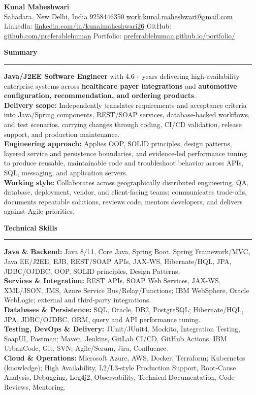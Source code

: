 \documentclass[11pt,letterpaper]{article}
\newcommand{\ressection}[1]{\Needspace{6\baselineskip}\vspace{8pt}\par\textbf{#1}\par\vspace{2pt}\hrule\vspace{5pt}}
\begin{document}
\pagestyle{empty}\raggedright\fontsize{11}{12.5}\selectfont

{\Large \textbf{Kunal Maheshwari}}\\
Sahadara, New Delhi, India \textbar{} 9258446350 \textbar{} \href{mailto:work.kunal.maheshwari@gmail.com}{work.kunal.maheshwari@gmail.com}\\
LinkedIn: \href{https://www.linkedin.com/in/kunalmaheshwari26}{linkedin.com/in/kunalmaheshwari26} \textbar{} GitHub: \href{https://github.com/preferablehuman}{github.com/preferablehuman} \textbar{} Portfolio: \href{https://preferablehuman.github.io/portfolio/}{preferablehuman.github.io/portfolio/}

\ressection{Summary}
\textbf{Java/J2EE Software Engineer} with 4.6+ years delivering high-availability enterprise systems across \textbf{healthcare payer integrations} and \textbf{automotive configuration, recommendation, and ordering products}.\\[2pt]
\textbf{Delivery scope:} Independently translates requirements and acceptance criteria into Java/Spring components, REST/SOAP services, database-backed workflows, and test scenarios, carrying changes through coding, CI/CD validation, release support, and production maintenance.\\[2pt]
\textbf{Engineering approach:} Applies OOP, SOLID principles, design patterns, layered service and persistence boundaries, and evidence-led performance tuning to produce reusable, maintainable code and troubleshoot behavior across APIs, SQL, messaging, and application servers.\\[2pt]
\textbf{Working style:} Collaborates across geographically distributed engineering, QA, database, deployment, vendor, and client-facing teams; communicates trade-offs, documents repeatable solutions, reviews code, mentors developers, and delivers against Agile priorities.

\ressection{Technical Skills}
\textbf{Java \& Backend:} Java 8/11, Core Java, Spring Boot, Spring Framework/MVC, Java EE/J2EE, EJB, REST/SOAP APIs, JAX-WS, Hibernate/HQL, JPA, JDBC/OJDBC, OOP, SOLID principles, Design Patterns.\\
\textbf{Services \& Integration:} REST APIs, SOAP Web Services, JAX-WS, XML/JSON, JMS, Azure Service Bus/Relay/Functions; IBM WebSphere, Oracle WebLogic; external and third-party integrations.\\
\textbf{Databases \& Persistence:} SQL, Oracle, DB2, PostgreSQL; Hibernate/HQL, JPA, JDBC/OJDBC, ORM, query and API performance tuning.\\
\textbf{Testing, DevOps \& Delivery:} JUnit/JUnit4, Mockito, Integration Testing, SoapUI, Postman; Maven, Jenkins, GitLab CI/CD, GitHub Actions, IBM UrbanCode, Git, SVN; Agile/Scrum, Jira, Confluence.\\
\textbf{Cloud \& Operations:} Microsoft Azure, AWS, Docker, Terraform; Kubernetes (knowledge); High Availability, L2/L3-style Production Support, Root-Cause Analysis, Debugging, Log4j2, Observability, Technical Documentation, Code Reviews, Mentoring.
\end{document}
